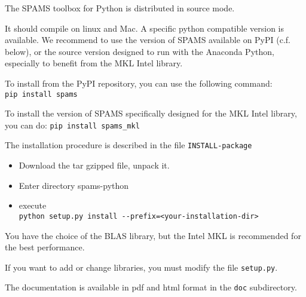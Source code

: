 The SPAMS toolbox for Python is distributed in source mode.

It should compile on linux and Mac. A specific python compatible version
is available. We recommend to use the version of SPAMS available on PyPI 
(c.f. below), or the source version designed to run with the Anaconda Python, 
especially to benefit from the MKL Intel library.

To install from the PyPI repository, you can use the following command: \\
  \verb;pip install spams;

To install the version of SPAMS specifically designed for the MKL Intel 
library, you can do:
  \verb;pip install spams_mkl;

The installation procedure is described in the file \verb=INSTALL-package=
\begin{itemize}
\item Download the tar gzipped file, unpack it.
\item Enter directory spams-python
\item execute \\
  \verb;python setup.py install --prefix=<your-installation-dir>;
\end{itemize}

You have the choice of the BLAS library, but the Intel
MKL is recommended for the best performance.

If you want to add or change libraries, you must modify
the file \verb=setup.py=.

The documentation is available in pdf and html format in the \verb=doc= subdirectory.

